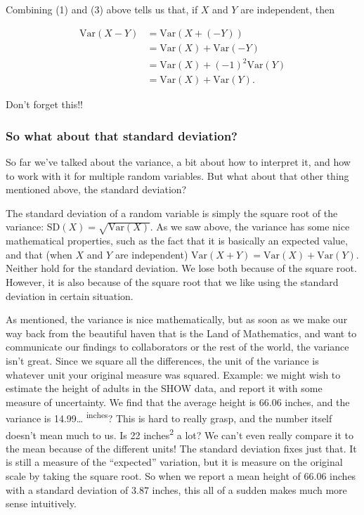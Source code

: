 \documentclass[]{book}
\theoremstyle{definition}
\theoremstyle{definition}
\theoremstyle{definition}
\theoremstyle{remark}
\begin{document}
Combining (1) and (3) above tells us that, if \(X\) and \(Y\) are independent, then

\begin{align*}
\text{Var}(X - Y) &= \text{Var}(X + (-Y)) \\
            &= \text{Var}(X) + \text{Var}(-Y) \\
            &= \text{Var}(X) + (-1)^2 \text{Var}(Y) \\
            &= \text{Var}(X) + \text{Var}(Y).
\end{align*}

Don't forget this!!

\hypertarget{so-what-about-that-standard-deviation}{%
\subsubsection{So what about that standard deviation?}\label{so-what-about-that-standard-deviation}}

So far we've talked about the variance, a bit about how to interpret it, and how to work with it for multiple random variables. But what about that other thing mentioned above, the standard deviation?

The standard deviation of a random variable is simply the square root of the variance: \(\text{SD}(X) = \sqrt{\text{Var}(X)}\). As we saw above, the variance has some nice mathematical properties, such as the fact that it is basically an expected value, and that (when \(X\) and \(Y\) are independent) \(\text{Var}(X + Y) = \text{Var}(X) + \text{Var}(Y)\). Neither hold for the standard deviation. We lose both because of the square root. However, it is also because of the square root that we like using the standard deviation in certain situation.

As mentioned, the variance is nice mathematically, but as soon as we make our way back from the beautiful haven that is the Land of Mathematics, and want to communicate our findings to collaborators or the rest of the world, the variance isn't great. Since we square all the differences, the unit of the variance is whatever unit your original measure was squared. Example: we might wish to estimate the height of adults in the SHOW data, and report it with some measure of uncertainty. We find that the average height is 66.06 inches, and the variance is 14.99\ldots{} \textsuperscript{inches}? This is hard to really grasp, and the number itself doesn't mean much to us. Is 22 inches\textsuperscript{2} a lot? We can't even really compare it to the mean because of the different units! The standard deviation fixes just that. It is still a measure of the ``expected'' variation, but it is measure on the original scale by taking the square root. So when we report a mean height of 66.06 inches with a standard deviation of 3.87 inches, this all of a sudden makes much more sense intuitively.
\end{document}
